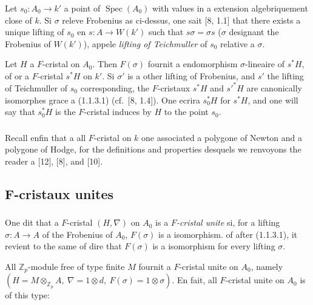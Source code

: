 \documentclass[12pt,a4paper]{article}
\theoremstyle{plain}
\theoremstyle{definition}
\theoremstyle{remark}
\DeclareMathOperator{\Spec}{Spec}
\begin{document}
\subsubsection{}

Let $s_0 : A_0 \to k'$ a point of $\Spec(A_0)$ with values in a extension algebriquement close of $k$. Si $\sigma$ releve Frobenius as ci-dessus, one sait [8, 1.1] that there exists a unique lifting of $s_0$ en $s : A \to W(k')$ such that $s\sigma = \sigma s$ ($\sigma$ designant the Frobenius of $W(k')$), appele \emph{lifting of Teichmuller} of $s_0$ relative a $\sigma$.

Let $H$ a $F$-cristal on $A_0$. Then $F(\sigma)$ fournit a endomorphism $\sigma$-lineaire of $s^*H$, of or a $F$-cristal $s^*H$ on $k'$. Si $\sigma'$ is a other lifting of Frobenius, and $s'$ the lifting of Teichmuller of $s_0$ corresponding, the $F$-cristaux $s^*H$ and $s'^*H$ are canonically isomorphes grace a (1.1.3.1) (cf.\ [8, 1.4]). One ecrira $s_0^*H$ for $s^*H$, and one will say that $s_0^*H$ is the $F$-cristal induces by $H$ to the point $s_0$.

\subsubsection{}

Recall enfin that a all $F$-cristal on $k$ one associated a polygone of Newton and a polygone of Hodge, for the definitions and properties desquels we renvoyons the reader a [12], [8], and [10].

\subsection{F-cristaux unites}

\subsubsection{}

One dit that a $F$-cristal $(H,\nabla)$ on $A_0$ is a \emph{$F$-cristal unite} si, for a lifting $\sigma : A \to A$ of the Frobenius of $A_0$, $F(\sigma)$ is a isomorphism. of after (1.1.3.1), it revient to the same of dire that $F(\sigma)$ is a isomorphism for every lifting $\sigma$.

All $\mathbb{Z}_p$-module free of type finite $M$ fournit a $F$-cristal unite on $A_0$, namely $(H = M \otimes_{\mathbb{Z}_p} A,\ \nabla = 1 \otimes d,\ F(\sigma) = 1 \otimes \sigma)$. En fait, all $F$-cristal unite on $A_0$ is of this type:
\end{document}

